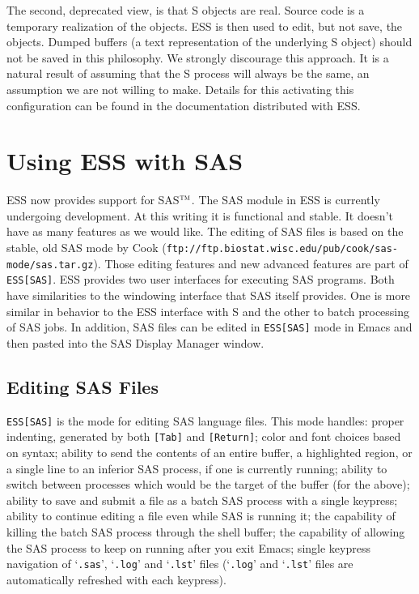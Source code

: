 \documentclass{article}
\newcommand{\stexttt}[1]{{\small\texttt{#1}}}
\newcommand{\ssf}[1]{{\small\sf{#1}}}
\newcommand{\tm}{$^{\mbox{\scriptsize\sc tm}}$}
\newenvironment{Salltt}{\small\begin{alltt}}{\end{alltt}}
\newcommand{\file}[1]{`\stexttt{#1}'}
\begin{document}
The second, deprecated view, is that S objects are real.  Source code
is a temporary realization of the objects.  ESS is then used to edit, but
not save, the objects.  Dumped buffers
(a text representation of the underlying S object)
should not be saved in this philosophy.  We strongly discourage this approach.
It is a
natural result of assuming that the S process will always be the
same, an assumption we are not willing to make.
Details for this activating this configuration can be found in the
documentation distributed with ESS.


\section{Using ESS with SAS}
\label{sec:SAS}

ESS now provides support for SAS\tm.  The SAS module in ESS is
currently undergoing development.  At this writing it is functional
and stable.  It doesn't have as many features as we would like.  The
editing of SAS files is based on the stable, old SAS mode by Cook
(\stexttt{ftp://ftp.biostat.wisc.edu/pub/cook/sas-mode/sas.tar.gz}).
Those editing features and new advanced features are part of
\stexttt{ESS[SAS]}.  ESS provides two user interfaces for executing SAS
programs.  Both have similarities to the
windowing interface that SAS itself provides.
One is more similar in behavior to the ESS interface with S
and the other to batch processing of SAS jobs.  In addition, SAS files can be
edited in \stexttt{ESS[SAS]} mode in Emacs and then pasted into the SAS
Display Manager \ssf{Program Editor} window.

\subsection{Editing SAS Files}
\label{sec:SAS:edit}

\stexttt{ESS[SAS]} is the mode for editing SAS language files.  This mode
handles: proper indenting, generated by both \stexttt{[Tab]} and
\stexttt{[Return]}; color and font choices based on syntax; ability to send
the contents of an entire buffer, a highlighted region, or a single
line to an inferior SAS process, if one is currently running; ability
to switch between processes which would be the target of the buffer
(for the above); ability to save and submit a file
as a batch SAS process with a single keypress; ability to continue
editing a file even while SAS is running it;
the capability of killing the batch SAS
process through the shell buffer; the capability of allowing the
SAS process to keep on
running after you exit Emacs; single keypress navigation of \file{.sas},
\file{.log} and \file{.lst} files (\file{.log} and \file{.lst}
files are automatically refreshed with each keypress).
\end{document}
